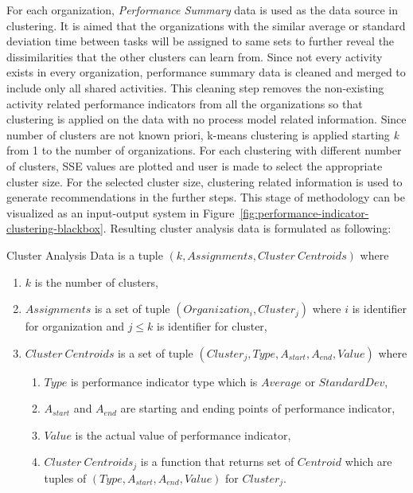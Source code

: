 For each organization, \textit{Performance Summary} data is used as the data source in clustering. It is aimed that the organizations with the similar average or standard deviation time between tasks will be assigned to same sets to further reveal the dissimilarities that the other clusters can learn from. Since not every activity exists in every organization, performance summary data is cleaned and merged to include only all shared activities. This cleaning step removes the non-existing activity related performance indicators from all the organizations so that clustering is applied on the data with no process model related information. Since number of clusters are not known priori, k-means clustering is applied starting \textit{k} from 1 to the number of organizations. For each clustering with different number of clusters, SSE values are plotted and user is made to select the appropriate cluster size. For the selected cluster size, clustering related information is used to generate recommendations in the further steps. This stage of methodology can be visualized as an input-output system in Figure~\ref{fig:performance-indicator-clustering-blackbox}. Resulting cluster analysis data is formulated as following:

\theoremstyle{definition}
\begin{definition}
Cluster Analysis Data is a tuple $(k, Assignments, Cluster\ Centroids)$ where
\begin{enumerate}
	\item $k$ is the number of clusters,
	\item $Assignments$ is a set of tuple $(Organization_{i}, Cluster_{j})$ where $i$ is identifier for organization and $j \leq k$ is identifier for cluster,
	\item $Cluster\ Centroids$ is a set of tuple $(Cluster_{j}, Type, A_{start}, A_{end}, Value)$ where
		\begin{enumerate}
			\item $Type$ is performance indicator type which is $Average$ or $StandardDev$,
			\item $A_{start}$ and $A_{end}$ are starting and ending points of performance indicator,
			\item $Value$ is the actual value of performance indicator,
			\item $Cluster\ Centroids_{j}$ is a function that returns set of $Centroid$ which are tuples of $(Type, A_{start}, A_{end}, Value)$ for $Cluster_{j}$.
		\end{enumerate}	
\end{enumerate}
\end{definition}
 
